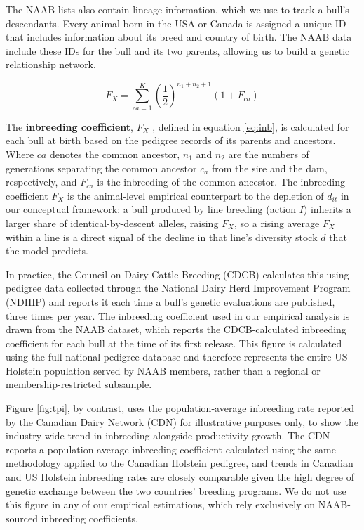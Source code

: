 \documentclass[12pt,letterpaper]{article}
\begin{document}
The NAAB lists also contain lineage information, which we use to track a bull's descendants. Every animal born in the USA or Canada is assigned a unique ID that includes information about its breed and country of birth. The NAAB data include these IDs for the bull and its two parents, allowing us to build a genetic relationship network. 

\begin{equation}
        F_{X}=\sum_{ca=1}^{K}\left(\dfrac{1}{2}\right)^{n_{1}+n_{2}+1}(1+F_{ca})\label{eq:inb}
\end{equation}

The \textbf{inbreeding coefficient}, $F_{X}$ \citep{Wright1922}, defined in equation \ref{eq:inb}, is calculated for each bull at birth based on the pedigree records of its parents and ancestors. Where $ca$ denotes the common ancestor, $n_{1}$ and $n_{2}$ are the numbers of generations separating the common ancestor $c_a$ from the sire and the dam, respectively, and $F_{ca}$ is the inbreeding of the common ancestor. The inbreeding coefficient $F_{X}$ is the animal-level empirical counterpart to the depletion of $d_{it}$ in our conceptual framework: a bull produced by line breeding (action $I$) inherits a larger share of identical-by-descent alleles, raising $F_{X}$, so a rising average $F_{X}$ within a line is a direct signal of the decline in that line's diversity stock $d$ that the model predicts.

In practice, the Council on Dairy Cattle Breeding (CDCB) calculates this using pedigree data collected through the National Dairy Herd Improvement Program (NDHIP) and reports it each time a bull's genetic evaluations are published, three times per year. The inbreeding coefficient used in our empirical analysis is drawn from the NAAB dataset, which reports the CDCB-calculated inbreeding coefficient for each bull at the time of its first release. This figure is calculated using the full national pedigree database and therefore represents the entire US Holstein population served by NAAB members, rather than a regional or membership-restricted subsample.

Figure \ref{fig:tpi}, by contrast, uses the population-average inbreeding rate reported by the Canadian Dairy Network (CDN) for illustrative purposes only, to show the industry-wide trend in inbreeding alongside productivity growth. The CDN reports a population-average inbreeding coefficient calculated using the same \cite{Wright1922} methodology applied to the Canadian Holstein pedigree, and trends in Canadian and US Holstein inbreeding rates are closely comparable given the high degree of genetic exchange between the two countries' breeding programs. We do not use this figure in any of our empirical estimations, which rely exclusively on NAAB-sourced inbreeding coefficients.
\end{document}
